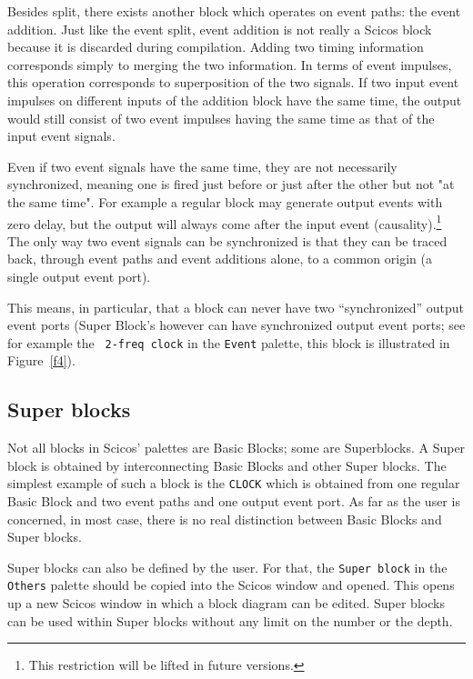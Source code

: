 Besides split, there exists another block which operates on event
paths: the event addition. Just like the event split, event addition is
not really a Scicos   block because it is discarded during compilation.
Adding two timing information corresponds simply to merging the two
information. In terms of event impulses, this operation corresponds to
superposition of the two signals. If two input event impulses on
different inputs of the 
addition block have the same time, the output would still consist of
two event impulses having the same time as that of the input event
signals.



Even if two event signals have the same time, they are not necessarily
synchronized, meaning one is fired just before or just after the
other but not "at the same time". 
For example a regular block may generate output events with zero delay,
but the output will always come after the input event
(causality).\footnote{This restriction will be lifted in future versions.}
The only way two event signals can be synchronized
is that they can be traced back, through event paths and event additions
alone, to a common origin (a single output event port).

This means, in particular, that a block can never have two
``synchronized'' output event ports (Super Block's however can have
synchronized output event ports; see for example the {\tt
2-freq clock} in the  {\tt Event} palette, this block is illustrated in
Figure~\ref{f4}).

\subsection{ Super blocks}
Not all blocks in Scicos' palettes are Basic Blocks; some are
Superblocks. A Super block is obtained by interconnecting Basic Blocks
and other Super blocks. The simplest example of such a block is the
{\tt CLOCK} which is obtained from one regular Basic Block and two event
paths and one output event port. As far as the user is concerned, in
most case, there is no real distinction between Basic Blocks and Super blocks. 

Super blocks can also be defined by the user. For that, the {\tt Super
block} in the {\tt Others} palette should be copied into the Scicos 
window and opened. This opens up a new Scicos  window in which a block
diagram can be edited. Super blocks can be used within Super blocks
without any limit on the number or the depth.



